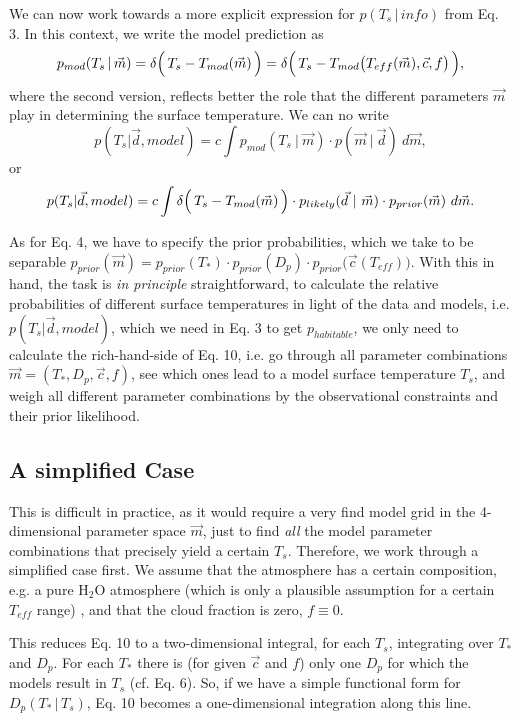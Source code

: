 \documentclass[12pt,preprint]{aastex}
\begin{document}
We can now work towards a more explicit expression for $p(T_s\, |\,  info)$ from Eq. 3. In this context, we write the
model prediction as 
\begin{equation}
p_{mod}(T_s\, |\, \vec{m}) = \delta\Bigl (\, T_s - T_{mod}(\vec{m})\, \Bigr )
= \delta\Bigl (\, T_s - T_{mod}\bigl (T_{eff}(\vec{m}), \vec{c}, f\bigr )\, \Bigr ),
\end{equation}
where the second version, reflects better the role that the different parameters $\vec{m}$ play in
determining the surface temperature. We can no write
\begin{equation}
p(T_s | \vec{d},model) = c \int p_{mod}(T_s\ |\ \vec{m})\cdot 
p(\vec{m}\ |\ \vec{d})\ d\vec{m},
\end{equation}
or 
\begin{equation}
p(T_s | \vec{d},model) = c \int   \delta\Bigl (\, T_s - T_{mod}(\vec{m})\, \Bigr )\cdot 
p_{likely}(\vec{d}\ |\ \vec{m})\cdot  p_{prior}(\vec{m})\ d\vec{m}.
\end{equation}

As for Eq. 4, we have to specify the prior probabilities, which we take to 
be separable $p_{prior} (\vec{m}) = p_{prior} (T_*)\cdot p_{prior} (D_p)\cdot p_{prior} \bigl (\vec{c}(T_{eff})\bigr )$.
With this in hand, the task is {\it in principle} straightforward, to calculate the relative probabilities
of different surface temperatures in light of the data and models, i.e. $p(T_s | \vec{d},model)$,
which we need in Eq. 3 to get $p_{habitable}$, we only need to calculate the rich-hand-side of Eq. 10,
i.e. go through all parameter combinations $\vec{m}=(T_*,D_p,\vec{c},f)$, see which ones lead 
to a model surface temperature $T_s$, and weigh all different parameter combinations by the 
observational constraints and their prior likelihood. 

\subsection{A simplified Case}

This is difficult in practice, as it would require a very find model grid in the 4-dimensional parameter
space $\vec{m}$, just to find {\it all} the model parameter combinations that precisely yield a certain $T_s$.
Therefore, we work through a simplified case first. We assume that the atmosphere has a certain composition,
e.g. a pure H$_2$O atmosphere (which is only a plausible assumption for a certain$T_{eff}$ range) ,
and that the cloud fraction is zero, $f\equiv 0$.

This reduces Eq. 10 to a two-dimensional integral, for each $T_s$, integrating over $T_*$ and $D_p$.
For each $T_*$ there is (for given $\vec{c}$ and $f$) only one $D_p$ for which the models result in $T_s$
(cf. Eq. 6). So, if we have a simple functional form for $D_p(T_*\, | \, T_s)$, Eq. 10 becomes a
one-dimensional integration along this line.


 
\end{document}
